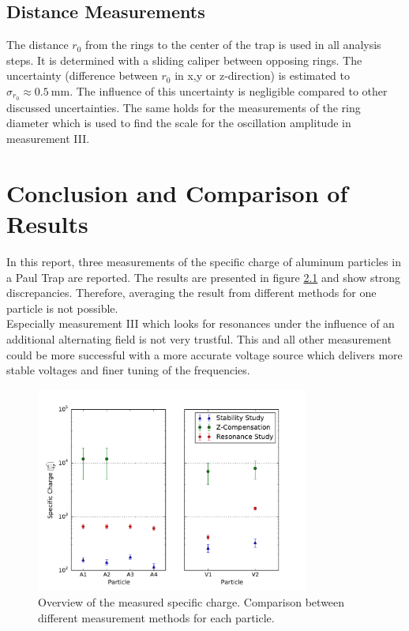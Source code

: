 \documentclass[
	paper=A4,
	parskip=full,
	chapterprefix=true,
	11pt,
	headings=normal,
	bibliography=totoc,
	listof=totoc,
	titlepage=on,
]{scrreprt}
\begin{document}
\section{Distance Measurements}
The distance $r_0$ from the rings to the center of the trap is used in all analysis steps. It is determined with a sliding caliper between opposing rings. The uncertainty (difference between $r_0$ in x,y or z-direction) is estimated to $\sigma_{r_0} \approx \SI{0.5}{\milli \meter}$. The influence of this uncertainty is negligible compared to other discussed uncertainties. The same holds for the measurements of the ring diameter which is used to find the scale for the oscillation amplitude in measurement III.

\chapter{Conclusion and Comparison of Results}

In this report, three measurements of the specific charge of aluminum particles in a Paul Trap are reported. The results are presented in figure \ref{fig:comp_results} and show strong discrepancies. Therefore, averaging the result from different methods for one particle is not possible. \\
Especially measurement III which looks for resonances under the influence of an additional alternating field is not very trustful. This and all other measurement could be more successful with a more accurate voltage source which delivers more stable voltages and finer tuning of the frequencies.

\begin{figure}
	\centering
	\includegraphics[width=0.8\textwidth]{paul_compareresults}
	\caption{Overview of the measured specific charge. Comparison between different measurement methods for each particle.}
	\label{fig:comp_results}
\end{figure}	

\cleardoublepage


{}
\end{document}

